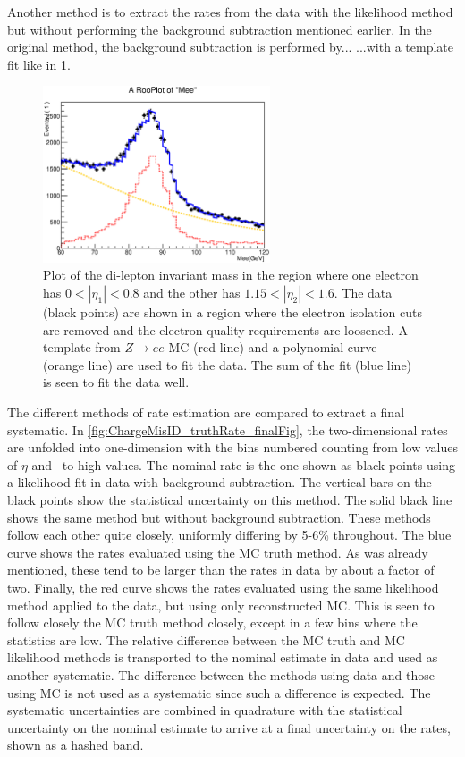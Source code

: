 Another method is to extract the rates from the data with the 
likelihood method but without performing the background
subtraction mentioned earlier. In the original method, 
the background subtraction is performed by... 
...with a template fit like in \fig\ref{fig:chargemisid_fitexample}.

\begin{figure}[htp]
\centering
\includegraphics[width=0.6\textwidth]{figures/ChargeMisID/Tot_Polynomial_0_2.eps}
\caption{Plot of the di-lepton invariant mass 
in the region where one electron has $0 < |\eta_1| < 0.8$
and the other has $1.15 < |\eta_2|<1.6$. The data (black points)
are shown in a region where the electron isolation cuts are removed
and the electron quality requirements are loosened.
A template from $Z\rightarrow ee$ MC (red line) and a polynomial
curve (orange line) are used to fit the data. The sum of the fit
(blue line) is seen to fit the data well.}
\label{fig:chargemisid_fitexample}
\end{figure} 


The different methods of rate estimation are compared to extract
a final systematic. In \fig\ref{fig:ChargeMisID_truthRate_finalFig},
the two-dimensional rates are unfolded into one-dimension
with the bins numbered counting from low values of $\eta$ and \pt~to
high values. The nominal rate is the one shown as black points
using a likelihood fit in data with background subtraction. The vertical
bars on the black points show the statistical uncertainty on this method.
The solid black line shows the same method but without background subtraction.
These methods follow each other quite closely, uniformly differing by 
5-6\% throughout.  The blue curve shows the rates evaluated
using the MC truth method. As was already mentioned, these tend
to be larger than the rates in data by about a factor of two. Finally, 
the red curve shows the rates evaluated using the same likelihood method
applied to the data, but using only reconstructed MC. This is seen to follow
closely the MC truth method closely, except in a few bins where the statistics
are low. The relative difference between the MC truth and MC likelihood methods
is transported to the nominal estimate in data and used as another systematic.
The difference between the methods using data and those using MC is not
used as a systematic since such a difference is expected.
The systematic uncertainties are combined in quadrature with the statistical
uncertainty on the nominal estimate to arrive at a final uncertainty on the
rates, shown as a hashed band.


